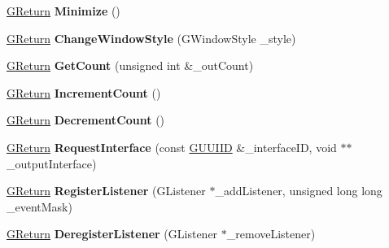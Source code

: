 \begin{DoxyCompactItemize}
\item 
\hyperlink{namespaceGW_a67a839e3df7ea8a5c5686613a7a3de21}{G\+Return} {\bfseries Minimize} ()\hypertarget{classAppWindow_ae9e134ba36c205e64ebac37caf452261}{}\label{classAppWindow_ae9e134ba36c205e64ebac37caf452261}

\item 
\hyperlink{namespaceGW_a67a839e3df7ea8a5c5686613a7a3de21}{G\+Return} {\bfseries Change\+Window\+Style} (G\+Window\+Style \+\_\+style)\hypertarget{classAppWindow_a6895da18e8659cd9e038349dd767148c}{}\label{classAppWindow_a6895da18e8659cd9e038349dd767148c}

\item 
\hyperlink{namespaceGW_a67a839e3df7ea8a5c5686613a7a3de21}{G\+Return} {\bfseries Get\+Count} (unsigned int \&\+\_\+out\+Count)\hypertarget{classAppWindow_af7c0579ce4d7364f8ff80e01a6e5970d}{}\label{classAppWindow_af7c0579ce4d7364f8ff80e01a6e5970d}

\item 
\hyperlink{namespaceGW_a67a839e3df7ea8a5c5686613a7a3de21}{G\+Return} {\bfseries Increment\+Count} ()\hypertarget{classAppWindow_aedc73ad831ae0df2fdf0f1d115e80c27}{}\label{classAppWindow_aedc73ad831ae0df2fdf0f1d115e80c27}

\item 
\hyperlink{namespaceGW_a67a839e3df7ea8a5c5686613a7a3de21}{G\+Return} {\bfseries Decrement\+Count} ()\hypertarget{classAppWindow_a3e742c0356ae236d19259d4d6653160b}{}\label{classAppWindow_a3e742c0356ae236d19259d4d6653160b}

\item 
\hyperlink{namespaceGW_a67a839e3df7ea8a5c5686613a7a3de21}{G\+Return} {\bfseries Request\+Interface} (const \hyperlink{structGW_1_1GUUIID}{G\+U\+U\+I\+ID} \&\+\_\+interface\+ID, void $\ast$$\ast$\+\_\+output\+Interface)\hypertarget{classAppWindow_a69e61e9391fe44d390b28e9f93875acf}{}\label{classAppWindow_a69e61e9391fe44d390b28e9f93875acf}

\item 
\hyperlink{namespaceGW_a67a839e3df7ea8a5c5686613a7a3de21}{G\+Return} {\bfseries Register\+Listener} (G\+Listener $\ast$\+\_\+add\+Listener, unsigned long long \+\_\+event\+Mask)\hypertarget{classAppWindow_a8814a169073eff08ca452a523f829bcc}{}\label{classAppWindow_a8814a169073eff08ca452a523f829bcc}

\item 
\hyperlink{namespaceGW_a67a839e3df7ea8a5c5686613a7a3de21}{G\+Return} {\bfseries Deregister\+Listener} (G\+Listener $\ast$\+\_\+remove\+Listener)\hypertarget{classAppWindow_aa24326ca0883442aded7ebcd41812425}{}\label{classAppWindow_aa24326ca0883442aded7ebcd41812425}


\end{DoxyCompactItemize}
